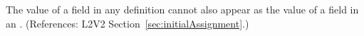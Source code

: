 The value of a  field in any \InitialAssignment definition
cannot also appear as the value of a  field in an
\AssignmentRule.  (References: L2V2 Section~\ref{sec:initialAssignment}.)
